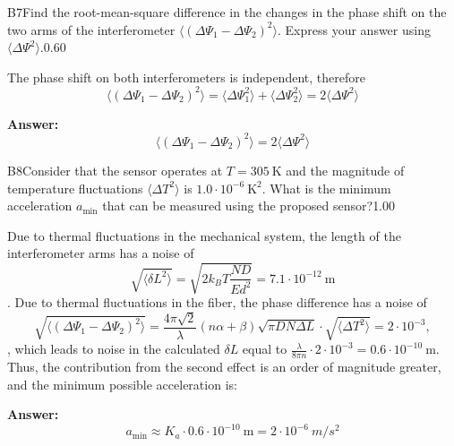 \documentclass[11pt,a4paper]{article}
\begin{document}
\begin{solcard}{B7}{Find the root-mean-square difference in the changes in the phase shift on the two arms of the interferometer $\langle (\Delta \Psi_1 - \Delta \Psi_2)^2 \rangle$. Express your answer using $\langle \Delta \Psi^2 \rangle$.}{0.60}

The phase shift on both interferometers is independent, therefore \[\langle (\Delta \Psi_1 - \Delta \Psi_2)^2 \rangle = \langle \Delta \Psi_1^2 \rangle + \langle \Delta \Psi_2^2 \rangle = 2 \langle \Delta \Psi^2 \rangle \]

\par\smallskip\noindent\textbf{Answer:} \[\langle (\Delta \Psi_1 - \Delta \Psi_2)^2 \rangle = 2\langle \Delta \Psi^2 \rangle \]
\end{solcard}

\begin{solcard}{B8}{Consider that the sensor operates at $T=305~\mathrm{K}$ and the magnitude of temperature fluctuations $\langle \Delta T^2 \rangle$ is $1.0 \cdot 10^{-6}~\mathrm{K}^2$. What is the minimum acceleration $a_\mathrm{min}$ that can be measured using the proposed sensor?}{1.00}

Due to thermal fluctuations in the mechanical system, the length of the interferometer arms has a noise of \[ \sqrt{\langle \delta L ^2 \rangle} = \sqrt{2k_B T  \frac{ND}{Ed^2}}=7.1 \cdot 10^{-12}~\mathrm{m}\]. Due to thermal fluctuations in the fiber, the phase difference has a noise of \[\sqrt{\langle (\Delta \Psi_1 - \Delta \Psi_2)^2 \rangle} = \frac{4 \pi \sqrt{2} }{\lambda}  (n \alpha + \beta) \sqrt{ \pi D N \Delta L} \cdot \sqrt{\langle \Delta T^2 \rangle}=2 \cdot 10^{-3},\], which leads to noise in the calculated $\delta L$ equal to $\frac{\lambda}{8 \pi n} \cdot 2 \cdot 10^{-3} = 0.6 \cdot 10^{-10}~\mathrm{m}$. Thus, the contribution from the second effect is an order of magnitude greater, and the minimum possible acceleration is:

\par\smallskip\noindent\textbf{Answer:} \[a_\mathrm{min} \approx K_a \cdot 0.6 \cdot 10^{-10}~\mathrm{m} = 2 \cdot 10^{-6}~m/s^2\]
\end{solcard}
\end{document}
